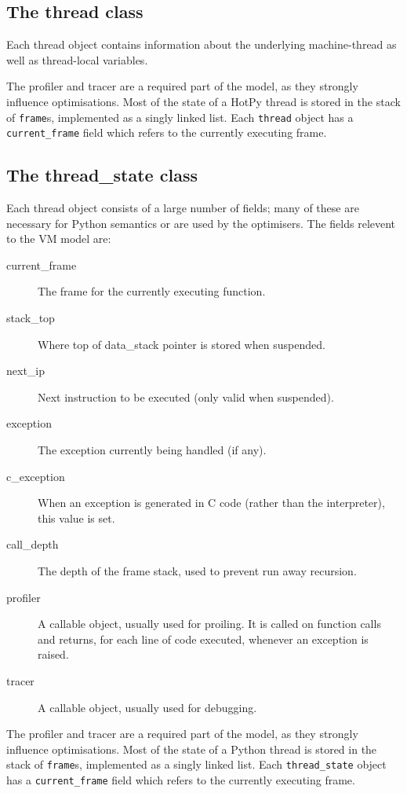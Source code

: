 \documentclass[a4paper,10pt]{article}
\begin{document}
\subsection{The thread class}

Each thread object contains information about the underlying machine-thread as well as thread-local variables.

The profiler and tracer are a required part of the model, as they strongly influence optimisations. Most of the state of a HotPy thread is stored in the stack of \verb|frame|s, implemented as a singly linked list. Each \verb|thread| object has a \verb|current_frame| field which refers to the currently executing frame. 

\subsection{The thread\_state class}

Each thread object consists of a large number of fields; many of these are necessary for Python semantics or are used by the optimisers. The fields relevent to the VM model are:
\begin{description}
\item[current\_frame] The frame for the currently executing function.
\item[stack\_top] Where top of data\_stack pointer is stored when suspended.
\item[next\_ip] Next instruction to be executed (only valid when suspended).
\item[exception] The exception currently being handled (if any).
\item[c\_exception] When an exception is generated in C code (rather than the interpreter), this value is set.
\item[call\_depth] The depth of the frame stack, used to prevent run away recursion.
\item[profiler] A callable object, usually used for proiling. It is called on function calls and returns, for each line of code executed, whenever an exception is raised.
\item[tracer] A callable object, usually used for debugging.
\end{description}

The profiler and tracer are a required part of the model, as they strongly influence optimisations. Most of the state of a Python thread is stored in the stack of \verb|frame|s, implemented as a singly linked list. Each \verb|thread_state| object has a \verb|current_frame| field which refers to the currently executing frame.
\end{document}

